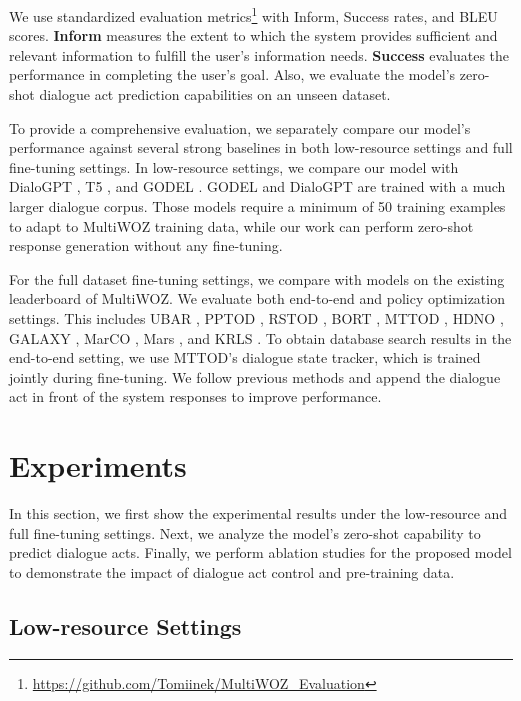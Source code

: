 We use standardized evaluation metrics\footnote{\url{https://github.com/Tomiinek/MultiWOZ_Evaluation}} with Inform, Success rates, and BLEU scores. 
\textbf{Inform} measures the extent to which the system provides sufficient and relevant information to fulfill the user's information needs.
\textbf{Success} evaluates the performance in completing the user's goal.
Also, we evaluate the model’s zero-shot dialogue act prediction capabilities on an unseen dataset.

To provide a comprehensive evaluation, we separately compare our model's performance against several strong baselines in both low-resource settings and full fine-tuning settings.
In low-resource settings, we compare our model with DialoGPT \cite{DBLP:conf/acl/ZhangSGCBGGLD20}, T5 \cite{DBLP:journals/corr/abs-1910-10683},
and GODEL \cite{Peng2022GODELLP}.
GODEL and DialoGPT are trained with a much larger dialogue corpus.
Those models require a minimum of 50 training examples to adapt to MultiWOZ training data,
while our work can perform zero-shot response generation without any fine-tuning.

For the full dataset fine-tuning settings, we compare with models on the existing leaderboard of MultiWOZ.
We evaluate both end-to-end and policy optimization settings.
This includes UBAR \cite{DBLP:journals/corr/abs-2106-05555}, PPTOD \cite{DBLP:conf/acl/SuSMG0LZ22}, RSTOD \cite{DBLP:journals/corr/abs-2208-07097}, BORT \cite{DBLP:conf/naacl/Sun0W022}, MTTOD \cite{Lee2021ImprovingET}, HDNO \cite{DBLP:journals/corr/abs-2006-06814}, GALAXY \cite{he2022galaxy}, MarCO \cite{DBLP:conf/acl/WangTWQY20}, Mars \cite{DBLP:journals/corr/abs-2210-08917}, and KRLS \cite{https://doi.org/10.48550/arxiv.2211.16773}.
To obtain database search results in the end-to-end setting, we use MTTOD's dialogue state tracker, which is trained jointly during fine-tuning.
We follow previous methods and append the dialogue act in front of the system responses to improve performance.

\section{Experiments}
In this section, we first show the experimental results under the low-resource and full fine-tuning settings.
Next, we analyze the model's zero-shot capability to predict dialogue acts.
Finally, we perform ablation studies for the proposed model to demonstrate the impact of dialogue act control and pre-training data.

\subsection{Low-resource Settings}

